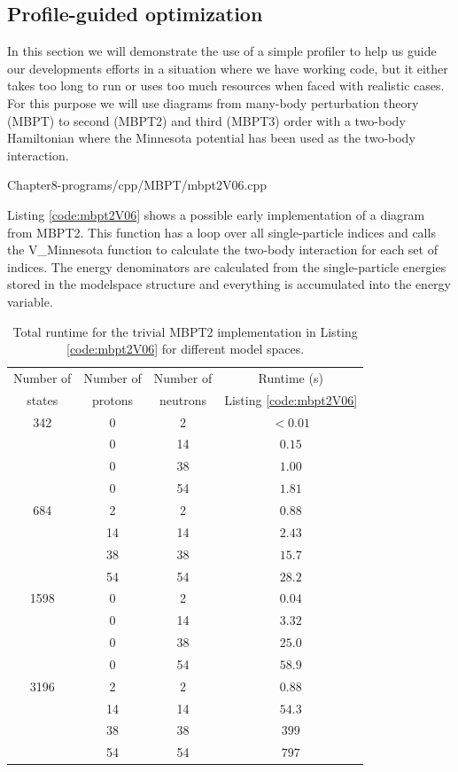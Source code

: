 \subsection{Profile-guided optimization}
In this section we will demonstrate the use of a simple profiler to help us
guide our developments efforts in a situation where we have working code, but it
either takes too long to run or uses too much resources when faced with
realistic cases. For this purpose we will use diagrams from many-body
perturbation theory (MBPT) to second (MBPT2) and third (MBPT3) order with a
two-body Hamiltonian where the Minnesota potential has been used as the two-body
interaction.

{Chapter8-programs/cpp/MBPT/mbpt2V06.cpp}

Listing \ref{code:mbpt2V06} shows a possible early implementation of a diagram from
MBPT2. This function has a loop over all single-particle indices and calls the
V\_Minnesota function to calculate the two-body interaction for each set of
indices. The energy denominators are calculated from the single-particle
energies stored in the modelspace structure and everything is accumulated into
the energy variable.

\begin{table}
\caption{Total runtime for the trivial MBPT2 implementation in Listing 
    \ref{code:mbpt2V06} for different model spaces.}\label{tab:mbpt2V06_runtime}
  \begin{center}
      \begin{tabular}{cccc}
      \hline
      Number of & Number of & Number of & Runtime (s) \\
      states & protons & neutrons & Listing \ref{code:mbpt2V06}\\
      \hline
      \hline
        342 & 0 & 2 & $< 0.01$ \\
         & 0 & 14 & $0.15$ \\
         & 0 & 38 & $1.00$ \\
         & 0 & 54 & $1.81$ \\
         684 & 2 & 2 & $0.88$ \\
         & 14 & 14 & $2.43$ \\
         & 38 & 38 & $15.7$ \\
         & 54 & 54 & $28.2$ \\
         1598 & 0 & 2 & $0.04$ \\
         & 0 & 14 & $3.32$ \\
         & 0 & 38 & $25.0$ \\
         & 0 & 54 & $58.9$ \\
         3196 & 2 & 2 & $0.88$ \\
         & 14 & 14 & $54.3$ \\
         & 38 & 38 & $399$ \\
         & 54 & 54 & $797$ \\
      \hline
      \end{tabular}
  \end{center}
\end{table}


